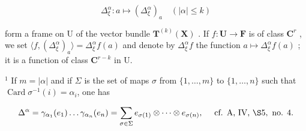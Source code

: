 \[
\Delta_ {\xi} ^ {\alpha}: a \mapsto (\Delta_ {\xi} ^ {\alpha}) _ {a} \quad (| \alpha | \leqslant k)
\]

form a frame on U of the vector bundle \(\mathbf{T}^{(k)}(\mathbf{X})\) . If \(f\colon \mathbf{U}\to \mathbf{F}\) is of class \(\mathbf{C}^r\) , we set \(\langle f, (\Delta_{\xi}^{\alpha})_a\rangle = \Delta_{\xi}^{\alpha}f(a)\) and denote by \(\Delta_{\xi}^{\alpha}f\) the function \(a\mapsto \Delta_{\xi}^{\alpha}f(a)\) ; it is a function of class \(\mathbf{C}^{r - k}\) in U.

\(^{1}\) If \(m = |\alpha|\) and if \(\Sigma\) is the set of maps \(\sigma\) from \(\{1, \ldots, m\}\) to \(\{1, \ldots, n\}\) such that \(\operatorname{Card}\sigma^{-1}(i)=\alpha_i\), one has

\[
\Delta^ {\alpha} = \gamma_{\alpha_1}(e_1) \dots \gamma_{\alpha_n}(e_n) = \sum_{\sigma \in \Sigma} e_{\sigma(1)} \otimes \dots \otimes e_{\sigma(n)}, \quad \text { cf. A, IV, } \S 5, \text { no. } 4.
\]

